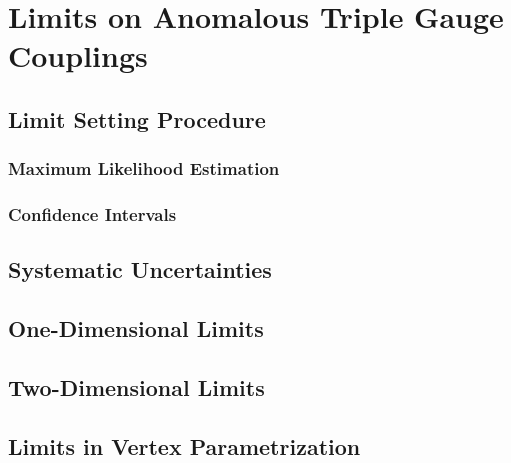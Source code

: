 \chapter{Limits on Anomalous Triple Gauge Couplings}
\label{chap::LimitsonAnomalousTripleGaugeCouplings}

\section{Limit Setting Procedure}
\subsection{Maximum Likelihood Estimation}
\subsection{Confidence Intervals}
\section{Systematic Uncertainties}
\section{One-Dimensional Limits}
\section{Two-Dimensional Limits}
\section{Limits in Vertex Parametrization}